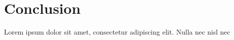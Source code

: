 \chapter{Conclusion}\label{ch:conclusion}

Lorem ipsum dolor sit amet, consectetur adipiscing elit. Nulla nec nisl nec